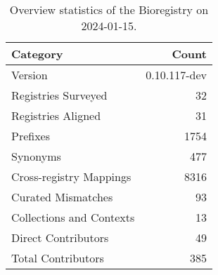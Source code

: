 \begin{table}
\caption{Overview statistics of the Bioregistry on 2024-01-15.}
\label{tab:bioregistry-summary}
\begin{tabular}{lr}
\toprule
Category & Count \\
\midrule
Version & 0.10.117-dev \\
Registries Surveyed & 32 \\
Registries Aligned & 31 \\
Prefixes & 1754 \\
Synonyms & 477 \\
Cross-registry Mappings & 8316 \\
Curated Mismatches & 93 \\
Collections and Contexts & 13 \\
Direct Contributors & 49 \\
Total Contributors & 385 \\
\bottomrule
\end{tabular}
\end{table}
